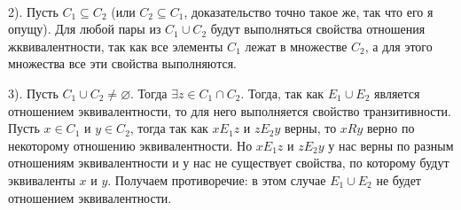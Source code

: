\documentclass[a4paper, 12pt]{article}
\begin{document}
    \\
    \par 2). Пусть $C_1 \subseteq C_2$ (или $C_2 \subseteq C_1$, доказательство точно такое же, так что его я опущу). Для любой пары из $C_1 \cup C_2$ будут выполняться свойства отношения жквивалентности, так как все элементы $C_1$ лежат в множестве $C_2$, а для этого множества все эти свойства выполняются.
    \\
    \par 3). Пусть $C_1 \cup C_2 \neq \varnothing$. Тогда $\exists z \in C_1 \cap C_2$. Тогда, так как $E_1 \cup E_2$ является отношением эквивалентности, то для него выполняется свойство транзитивности. Пусть $x \in C_1$ и $y \in C_2$, тогда так как $xE_1z$ и $zE_2y$ верны, то $xRy$ верно по некоторому отношению эквивалентности. Но $xE_1z$ и $zE_2y$ у нас верны по разным отношениям эквивалентности и у нас не существует свойства, по которому будут эквиваленты $x$ и $y$. Получаем противоречие: в этом случае $E_1 \cup E_2$ не будет отношением эквивалентности.
\end{document}
